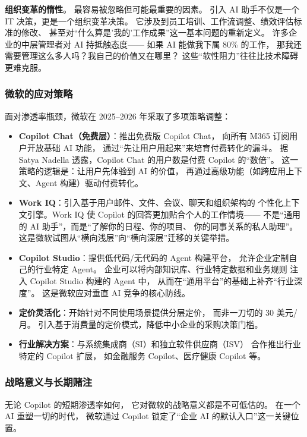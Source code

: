 \textbf{组织变革的惰性}。
最容易被忽略但可能最重要的因素。
引入 AI 助手不仅是一个 IT 决策，更是一个组织变革决策。
它涉及到员工培训、工作流调整、绩效评估标准的修改、
甚至对``什么算是'我的'工作成果''这一基本问题的重新定义。
许多企业的中层管理者对 AI 持抵触态度——
如果 AI 能做我下属 80\% 的工作，
那我还需要管理这么多人吗？我自己的价值又在哪里？
这些``软性阻力''往往比技术障碍更难克服。

\subsubsection{微软的应对策略}
面对渗透率瓶颈，微软在 2025--2026 年采取了多项策略调整：

\begin{itemize}[noitemsep]
  \item \textbf{Copilot Chat（免费层）}：推出免费版 Copilot Chat，
        向所有 M365 订阅用户开放基础 AI 功能，
        通过``先让用户用起来''来培育付费转化的漏斗。
        据 Satya Nadella 透露，Copilot Chat 的用户数是付费 Copilot 的``数倍''。
        这一策略的逻辑是：让用户先体验到 AI 的价值，
        再通过高级功能（如跨应用上下文、Agent 构建）驱动付费转化。
  \item \textbf{Work IQ}：引入基于用户邮件、文件、会议、聊天和组织架构的
        个性化上下文引擎。Work IQ 使 Copilot 的回答更加贴合个人的工作情境——
        不是``通用的 AI 助手''，而是``了解你的日程、你的项目、
        你的同事关系的私人助理''。
        这是微软试图从``横向浅层''向``横向深层''迁移的关键举措。
  \item \textbf{Copilot Studio}：提供低代码/无代码的 Agent 构建平台，
        允许企业定制自己的行业特定 Agent。
        企业可以将内部知识库、行业特定数据和业务规则
        注入 Copilot Studio 构建的 Agent 中，
        从而在``通用平台''的基础上补齐``行业深度''。
        这是微软应对垂直 AI 竞争的核心防线。
  \item \textbf{定价灵活化}：开始针对不同使用场景提供分层定价，
        而非一刀切的 30 美元/月。
        引入基于消费量的定价模式，降低中小企业的采购决策门槛。
  \item \textbf{行业解决方案}：与系统集成商（SI）和独立软件供应商（ISV）
        合作推出行业特定的 Copilot 扩展，
        如金融服务 Copilot、医疗健康 Copilot 等。
\end{itemize}

\subsubsection{战略意义与长期赌注}
无论 Copilot 的短期渗透率如何，
它对微软的战略意义都是不可低估的。
在一个 AI 重塑一切的时代，
微软通过 Copilot 锁定了``企业 AI 的默认入口''这一关键位置。

